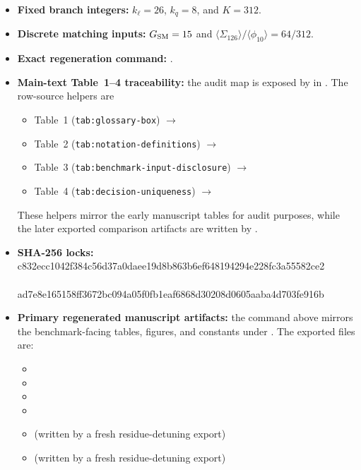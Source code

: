 \documentclass[11pt]{article}
\begin{document}
\begin{itemize}
\item \textbf{Fixed branch integers:} $k_{\ell}=26$, $k_q=8$, and $K=312$.
\item \textbf{Discrete matching inputs:} $G_{\rm SM}=15$ and $\langle \Sigma_{126} \rangle / \langle \phi_{10} \rangle = 64/312$.
\item \textbf{Exact regeneration command:} .
\item \textbf{Main-text Table~1--4 traceability:} the audit map is exposed by  in . The row-source helpers are
\begin{itemize}
\item Table~1 (\texttt{tab:glossary-box}) $\rightarrow$ 
\item Table~2 (\texttt{tab:notation-definitions}) $\rightarrow$ 
\item Table~3 (\texttt{tab:benchmark-input-disclosure}) $\rightarrow$ 
\item Table~4 (\texttt{tab:decision-uniqueness}) $\rightarrow$ 
\end{itemize}
These helpers mirror the early manuscript tables for audit purposes, while the later exported comparison artifacts are written by .
\item \textbf{SHA-256 locks:}
\\
{\small\ttfamily c832ecc1042f384c56d37a0daee19d8\allowbreak b863b6ef648194294e228fc3a55582ce2}\\
\\
{\small\ttfamily ad7e8e165158ff3672bc094a05f0fb1e\allowbreak af6868d30208d0605aaba4d703fe916b}
\item \textbf{Primary regenerated manuscript artifacts:} the command above mirrors the benchmark-facing tables, figures, and constants under . The exported files are:
\begin{itemize}
\item {}
\item {}
\item {}
\item {}
\item {} (written by a fresh residue-detuning export)
\item {} (written by a fresh residue-detuning export)
\end{itemize}
\end{itemize}
\end{document}
